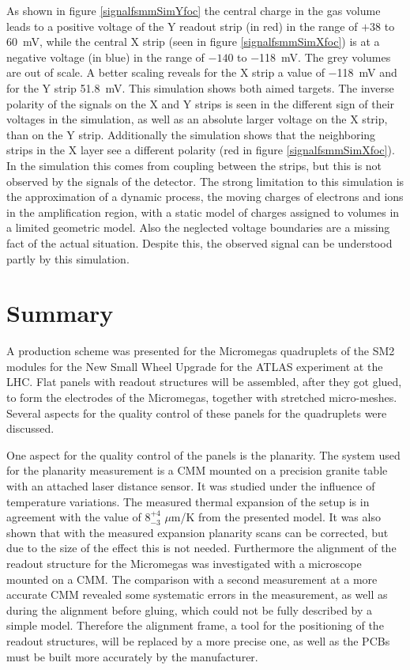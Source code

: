 \documentclass[
a4paper,                                %
twoside,                                %
BCOR1.4cm,                      %
10pt,                           %
headings=normal,                %
headsepline,                    %
clearplainpage, %
final,                                  %
div=14,
parskip=full,
openright,
bibliography=toc
]{scrreprt}
\begin{document}
As shown in figure \ref{signalfsmmSimYfoc} the central charge in the gas volume leads to a positive voltage of the Y readout strip (in red) in the range of $+38$ to \SI{+60}{\mV}, while the central X strip (seen in figure \ref{signalfsmmSimXfoc}) is at a negative voltage (in blue) in the range of $-140$ to \SI{-118}{\mV}. The grey volumes are out of scale. A better scaling reveals for the X strip a value of \SI{-118}{\mV} and for the Y strip \SI{51.8}{\mV}. This simulation shows both aimed targets. The inverse polarity of the signals on the X and Y strips is seen in the different sign of their voltages in the simulation, as well as an absolute larger voltage on the X strip, than on the Y strip. Additionally the simulation shows that the neighboring strips in the X layer see a different polarity (red in figure \ref{signalfsmmSimXfoc}). In the simulation this comes from coupling between the strips, but this is not observed by the signals of the detector. The strong limitation to this simulation is the approximation of a dynamic process, the moving charges of electrons and ions in the amplification region, with a static model of charges assigned to volumes in a limited geometric model. Also the neglected voltage boundaries are a missing fact of the actual situation. Despite this, the observed signal can be understood partly by this simulation. 

\chapter{Summary}

A production scheme was presented for the Micromegas quadruplets of the SM2 modules for the New Small Wheel Upgrade for the ATLAS experiment at the LHC. Flat panels with readout structures will be assembled, after they got glued, to form the electrodes of the Micromegas, together with stretched micro-meshes. Several aspects for the quality control of these panels for the quadruplets were discussed. 

One aspect for the quality control of the panels is the planarity. The system used for the planarity measurement is a CMM mounted on a precision granite table with an attached laser distance sensor. It was studied under the influence of temperature variations. The measured thermal expansion of the setup is in agreement with the value of $8_{-3}^{+4}$ $\mu$m/K from the presented model. It was also shown that with the measured expansion planarity scans can be corrected, but due to the size of the effect this is not needed. 
%
Furthermore the alignment of the readout structure for the Micromegas was investigated with a microscope mounted on a CMM. The comparison with a second measurement at a more accurate CMM revealed some systematic errors in the measurement, as well as during the alignment before gluing, which could not be fully described by a simple model. Therefore the alignment frame, a tool for the positioning of the readout structures, will be replaced by a more precise one, as well as the PCBs must be built more accurately by the manufacturer.
\end{document}

